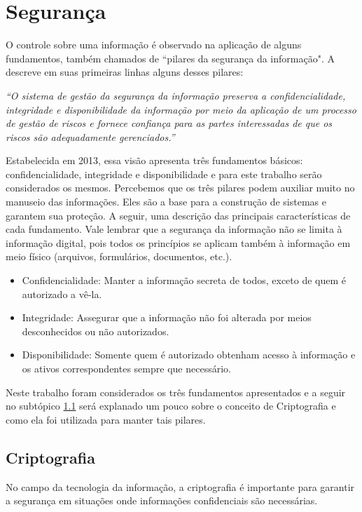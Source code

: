 \documentclass[12pt, a4paper]{report}
\begin{document}
\section{ Segurança}
\label{sec:seguranca}

O controle sobre uma informação é observado na aplicação de alguns fundamentos, também chamados de “pilares da segurança da informação". A \cite{iso27001} descreve em suas primeiras linhas alguns desses pilares:

\textit{“O sistema de gestão da segurança da informação preserva a confidencialidade, integridade e disponibilidade da informação por meio da aplicação de um processo de gestão de riscos e fornece confiança para as partes interessadas de que os riscos são adequadamente gerenciados.”}

Estabelecida em 2013, essa visão apresenta três fundamentos básicos: confidencialidade, integridade e disponibilidade e para este trabalho serão considerados os mesmos. Percebemos que os três pilares podem auxiliar muito no manuseio das informações. Eles são a base para a construção de sistemas e garantem sua proteção. A seguir, uma descrição das principais características de cada fundamento. Vale lembrar que a segurança da informação não se limita à informação digital, pois todos os princípios se aplicam também à informação em meio físico (arquivos, formulários, documentos, etc.).
\begin{itemize}
\item Confidencialidade: Manter a informação secreta de todos, exceto de quem é autorizado a vê-la.
\item Integridade: Assegurar que a informação não foi alterada por meios desconhecidos ou não autorizados.
\item Disponibilidade: Somente quem é autorizado obtenham acesso à informação e os ativos correspondentes sempre  que necessário.
\end{itemize}

Neste trabalho foram considerados os três fundamentos apresentados e a seguir no subtópico \ref{subsec:criptografia} será explanado um pouco sobre o conceito de Criptografia e como ela foi utilizada para manter tais pilares.

\subsection{Criptografia}
\label{subsec:criptografia}

No campo da tecnologia da informação, a criptografia é importante para garantir a segurança em situações onde informações confidenciais são necessárias.
\end{document}
